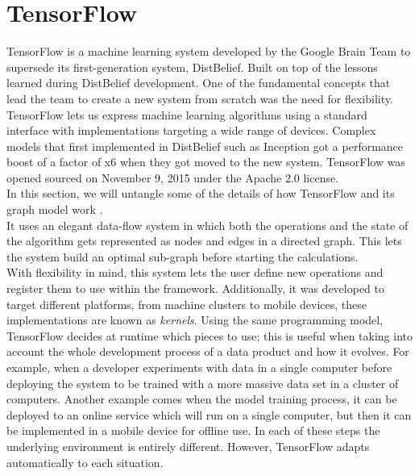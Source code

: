 \section{TensorFlow}

TensorFlow is a machine learning system developed by the Google Brain Team to supersede its first-generation system, DistBelief. Built on top of the lessons learned during DistBelief development. One of the fundamental concepts that lead the team to create a new system from scratch was the need for flexibility. TensorFlow lets us express machine learning algorithms using a standard interface with implementations targeting a wide range of devices. Complex models that first implemented in DistBelief such as Inception got a performance boost of a factor of x6 \cite{tensorflow2015-whitepaper} when they got moved to the new system. TensorFlow was opened sourced on November 9, 2015 under the Apache 2.0 license.\\ 

In this section, we will untangle some of the details of how TensorFlow and its graph model work \cite{DBLP:journals/corr/AbadiBCCDDDGIIK16}.\\

It uses an elegant data-flow system in which both the operations and the state of the algorithm gets represented as nodes and edges in a directed graph. This lets the system build an optimal sub-graph before starting the calculations.\\

With flexibility in mind, this system lets the user define new operations and register them to use within the framework. Additionally, it was developed to target different platforms, from machine clusters to mobile devices, these implementations are known as \textit{kernels}. Using the same programming model, TensorFlow decides at runtime which pieces to use; this is useful when taking into account the whole development process of a data product and how it evolves. For example, when a developer experiments with data in a single computer before deploying the system to be trained with a more massive data set in a cluster of computers. Another example comes when the model training process, it can be deployed to an online service which will run on a single computer, but then it can be implemented in a mobile device for offline use. In each of these steps the underlying environment is entirely different. However, TensorFlow adapts automatically to each situation.\\


